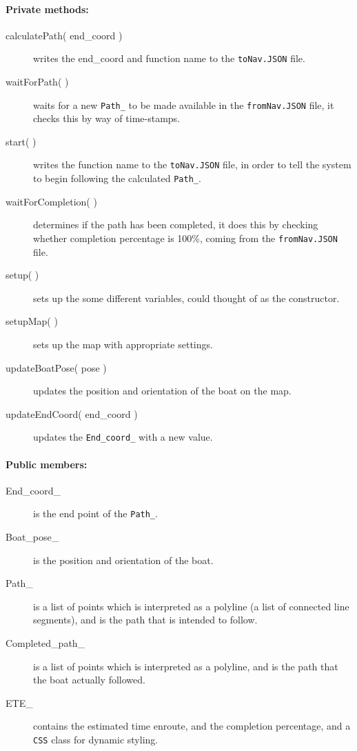 \paragraph{Private methods:}
\begin{adjustwidth}{2.5em}{0pt}\begin{description}
		\item [calculatePath( end_coord )] writes the end_coord and function name to the \texttt{toNav.JSON} file. 
		\item [waitForPath( )] waits for a new \texttt{Path_} to be made available in the \texttt{fromNav.JSON} file, it checks this by way of time-stamps.
		\item [start( )] writes the function name to the \texttt{toNav.JSON} file, in order to tell the system to begin following the calculated \texttt{Path_}.
		\item [waitForCompletion( )] determines if the path has been completed, it does this by checking whether completion percentage is 100\%, coming from the \texttt{fromNav.JSON} file.
		\item [setup( )] sets up the some different variables, could thought of as the constructor.
		\item [setupMap( )] sets up the map with appropriate settings.
		\item [updateBoatPose( pose )] updates the position and orientation of the boat on the map.
		\item [updateEndCoord( end_coord )] updates the \texttt{End_coord_} with a new value.
\end{description}\end{adjustwidth}

\paragraph{Public members:}
\begin{adjustwidth}{2.5em}{0pt}\begin{description}
		\item [End_coord_] is the end point of the \texttt{Path_}.
		\item [Boat_pose_] is the position and orientation of the boat.
		\item [Path_] is a list of points which is interpreted as a polyline (a list of connected line segments), and is the path that is intended to follow.
		\item[Completed_path_] is a list of points which is interpreted as a polyline, and is the path that the boat actually followed.
		\item[ETE_] contains the estimated time enroute, and the completion percentage, and a \texttt{CSS} class for dynamic styling. 
\end{description}\end{adjustwidth}


